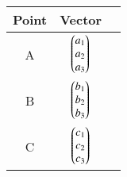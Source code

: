 \begin{tabular}[12pt]{ |c| c| c|} 
    \hline
    {Point} & {Vector} \\ 
    \hline
    A & $ \begin{pmatrix}a_1 \\ a_2\\a_3\end{pmatrix} $ \\
    \hline 
    B & $ \begin{pmatrix}b_1 \\ b_2\\b_3\end{pmatrix} $  \\
    \hline
    C & $ \begin{pmatrix}c_1 \\ c_2\\c_3\end{pmatrix} $   \\
    \hline  
    \end{tabular}
